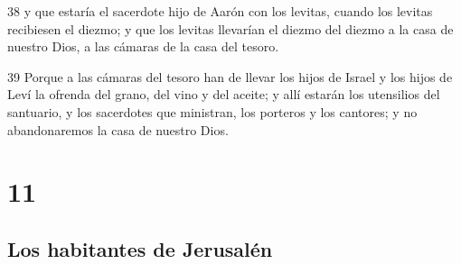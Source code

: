 \par 38 y que estaría el sacerdote hijo de Aarón con los levitas, cuando los levitas recibiesen el diezmo; y que los levitas llevarían el diezmo del diezmo a la casa de nuestro Dios, a las cámaras de la casa del tesoro.
\par 39 Porque a las cámaras del tesoro han de llevar los hijos de Israel y los hijos de Leví la ofrenda del grano, del vino y del aceite; y allí estarán los utensilios del santuario, y los sacerdotes que ministran, los porteros y los cantores; y no abandonaremos la casa de nuestro Dios.

\chapter{11}

\section*{Los habitantes de Jerusalén}

